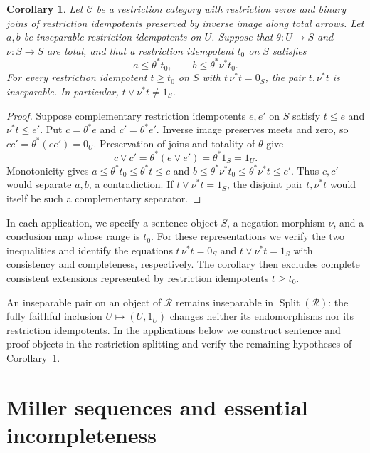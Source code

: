 \documentclass[11pt]{article}
\newtheorem{corollary}[theorem]{Corollary}
\begin{document}
\begin{corollary}\label{cor:domain-incompleteness}
Let $\mathcal C$ be a restriction category with restriction zeros and
binary joins of restriction idempotents preserved by inverse image along total arrows.
Let $a,b$ be inseparable restriction idempotents on $U$. Suppose that
$\theta:U\to S$ and $\nu:S\to S$ are total, and that a restriction
idempotent $t_0$ on $S$ satisfies
\[
 a\le\theta^*t_0,\qquad b\le\theta^*\nu^*t_0.
\]
For every restriction idempotent $t\ge t_0$ on $S$ with $t\,\nu^*t=0_S$,
the pair $t,\nu^*t$ is inseparable. In particular,
$t\vee\nu^*t\ne1_S$.
\end{corollary}
\begin{proof}
Suppose complementary restriction idempotents $e,e'$ on $S$ satisfy
$t\le e$ and $\nu^*t\le e'$. Put
$c=\theta^*e$ and $c'=\theta^*e'$. Inverse image preserves
meets and zero, so $cc'=\theta^*(ee')=0_U$.
Preservation of joins and totality of $\theta$ give
\[
 c\vee c'=\theta^*(e\vee e')=\theta^*1_S=1_U.
\]
Monotonicity gives
$a\le\theta^*t_0\le\theta^*t\le c$ and
$b\le\theta^*\nu^*t_0\le\theta^*\nu^*t\le c'$.
Thus $c,c'$ would separate $a,b$, a contradiction.
If $t\vee\nu^*t=1_S$, the disjoint pair $t,\nu^*t$ would
itself be such a complementary separator.
\end{proof}

In each application, we specify a sentence object $S$, a negation
morphism $\nu$, and a conclusion map whose range is $t_0$.
For these representations we verify the two inequalities and identify
the equations $t\,\nu^*t=0_S$ and $t\vee\nu^*t=1_S$ with
consistency and completeness, respectively. The corollary then excludes
complete consistent extensions represented by restriction idempotents
$t\ge t_0$.

An inseparable pair on an object of $\mathscr R$ remains inseparable
in $\operatorname{Split}(\mathscr R)$: the fully faithful inclusion
$U\mapsto(U,1_U)$ changes neither its endomorphisms nor its restriction idempotents.
In the applications below we construct sentence and proof objects in
the restriction splitting and verify the remaining hypotheses of
Corollary~\ref{cor:domain-incompleteness}.

\section{Miller sequences and essential incompleteness}\label{sec:miller}
\end{document}
